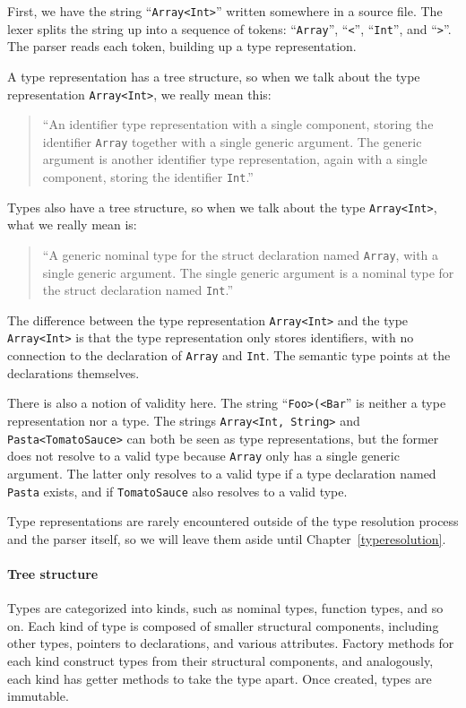 \documentclass[a4paper,headsepline,bibliography=totoc,toc=flat,fleqn,twoside=semi]{scrbook}
\theoremstyle{definition}
\theoremstyle{definition}
\theoremstyle{definition}
\begin{document}
First, we have the string ``\texttt{Array<Int>}'' written somewhere in a source file. The lexer splits the string up into a sequence of tokens: ``\texttt{Array}'', ``\texttt{<}'', ``\texttt{Int}'', and ``\texttt{>}''. The parser reads each token, building up a type representation.

A type representation has a tree structure, so when we talk about the type representation \texttt{Array<Int>}, we really mean this:
\begin{quote}
``An identifier type representation with a single component, storing the identifier \texttt{Array} together with a single generic argument. The generic argument is another identifier type representation, again with a single component, storing the identifier \texttt{Int}.''
\end{quote}
Types also have a tree structure, so when we talk about the type \texttt{Array<Int>}, what we really mean is:
\begin{quote}
``A generic nominal type for the struct declaration named \texttt{Array}, with a single generic argument. The single generic argument is a nominal type for the struct declaration named \texttt{Int}.''
\end{quote}
The difference between the type representation \texttt{Array<Int>} and the type \texttt{Array<Int>} is that the type representation only stores identifiers, with no connection to the declaration of \texttt{Array} and \texttt{Int}. The semantic type points at the declarations themselves.

There is also a notion of validity here. The string ``\texttt{Foo>(<Bar}'' is neither a type representation nor a type. The strings \texttt{Array<Int, String>} and \texttt{Pasta<TomatoSauce>} can both be seen as type representations, but the former does not resolve to a valid type because \texttt{Array} only has a single generic argument. The latter only resolves to a valid type if a type declaration named \texttt{Pasta} exists, and if \texttt{TomatoSauce} also resolves to a valid type.

Type representations are rarely encountered outside of the type resolution process and the parser itself, so we will leave them aside until Chapter~\ref{typeresolution}.

\paragraph{Tree structure} Types are categorized into kinds, such as nominal types, function types, and so on. Each kind of type is composed of smaller structural components, including other types, pointers to declarations, and various attributes. Factory methods for each kind construct types from their structural components, and analogously, each kind has getter methods to take the type apart. Once created, types are immutable.
\end{document}
